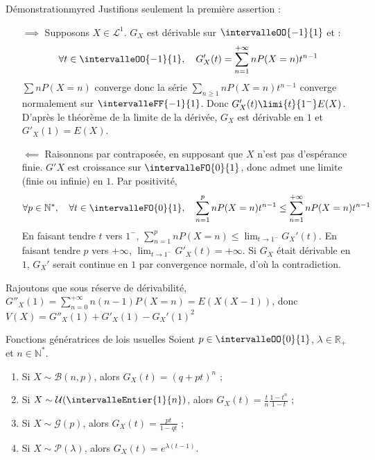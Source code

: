     \begin{demo}{Démonstration}{myred}
        Justifions seulement la première assertion :
        \begin{itemize}
            \item[$\implies$] Supposons $X \in \mathcal{L}^1$. $G_X$ est dérivable sur $\intervalleOO{-1}{1}$ et :
            \[ \forall t \in \intervalleOO{-1}{1}, \quad G_X'(t) = \sum_{n = 1}^{+\infty} n P(X = n) t^{n-1} \]    
            $\sum n P(X = n)$ converge donc la série $\sum_{n \geq 1} n P(X = n) t^{n-1}$ converge normalement sur $\intervalleFF{-1}{1}$. Donc $G_X'(t) \limi{t}{1^-} E(X)$. D’après le théorème de la limite de la dérivée, $G_X$ est dérivable en $1$ et $G'_X(1) = E(X)$. 
            \item[$\impliedby$] Raisonnons par contraposée, en supposant que $X$ n’est pas d’espérance finie. $G'X$ est croissance sur $\intervalleFO{0}{1}$, donc admet une limite (finie ou infinie) en $1$. Par positivité, 
            \[ \forall p \in \mathbb{N}^*, \quad \forall t \in \intervalleFO{0}{1}, \quad \sum_{n = 1}^p n P(X = n) t^{n-1} \leq \sum_{n=1}^{+\infty} n P(X = n) t^{n-1} \]  
            En faisant tendre $t$ vers $1^-$, $\sum_{n=1}^{p} nP(X = n) \leq \lim_{t \to 1^-} G_X'(t)$. En faisant tendre $p$ vers $+\infty$, $\lim_{t \to 1^-} G'_X(t) = + \infty$. Si $G_X$ était dérivable en $1$, $G_X'$ serait continue en $1$ par convergence normale, d’où la contradiction.
        \end{itemize}
        Rajoutons que sous réserve de dérivabilité, $G''_X(1) = \sum_{n=0}^{+\infty} n(n-1)P(X=n) = E(X(X-1))$, donc $V(X) = G''_X(1) + G'_X(1) - G_X'(1)^2$
    \end{demo}

    \begin{prop}{Fonctions génératrices de lois usuelles}{}
        Soient $p \in \intervalleOO{0}{1}$, $\lambda \in \mathbb{R}_+$ et $n \in \mathbb{N}^*$.
        \begin{enumerate}
            \item Si $X \sim \mathcal{B}(n,p)$, alors $G_X(t) = (q + pt)^n$ ;
            \item Si $X \sim \mathcal{U}(\intervalleEntier{1}{n})$, alors $G_X(t) = \frac{t}{n} \frac{1 - t^n}{1 - t}$ ;
            \item Si $X \sim \mathcal{G}(p)$, alors $G_X(t) = \frac{pt}{1 - qt}$ ;
            \item Si $X \sim \mathcal{P}(\lambda)$, alors $G_X(t) = e^{\lambda(t-1)}$.
        \end{enumerate}
    \end{prop}

